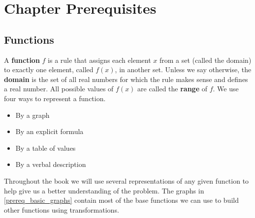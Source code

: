 \section{Chapter Prerequisites}\label{limits_prereq}\thispagestyle{fancy}

\prereqIntro

\subsection{Functions}

A \textbf{function} $f$ is a rule that assigns each element $x$ from a set (called the domain) to exactly one element, called $f(x)$, in another set. Unless we say otherwise, the \textbf{domain} is the set of all real numbers for which the rule makes sense and defines a real number. All possible values of $f(x)$ are called the \textbf{range} of $f$. We use four ways to represent a function.
\begin{multicols}{2}
\begin{itemize}
\item By a graph
\item By an explicit formula
\item By a table of values
\item By a verbal description
\end{itemize}
\end{multicols}

Throughout the book we will use several representations of any given function to help give us a better understanding of the problem. The graphs in \autoref{prereq_basic_graphs} contain most of the base functions we can use to build other functions using transformations.

